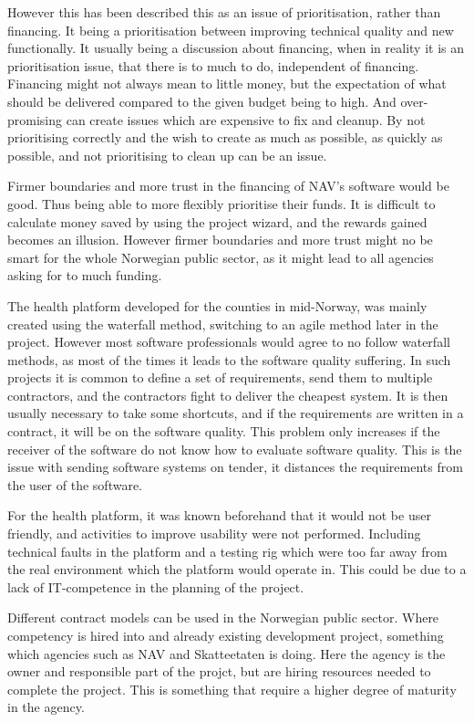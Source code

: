 However this has been described this as an issue of prioritisation, rather than financing. It being a prioritisation between improving technical quality and new functionally. It usually being a discussion about financing, when in reality it is an prioritisation issue, that there is to much to do, independent of financing. Financing might not always mean to little money, but the expectation of what should be delivered compared to the given budget being to high. And over-promising can create issues which are expensive to fix and cleanup. By not prioritising correctly and the wish to create as much as possible, as quickly as possible, and not prioritising to clean up can be an issue.

Firmer boundaries and more trust in the financing of NAV's software would be good. Thus being able to more flexibly prioritise their funds. It is difficult to calculate money saved by using the project wizard, and the rewards gained becomes an illusion. However firmer boundaries and more trust might no be smart for the whole Norwegian public sector, as it might lead to all agencies asking for to much funding.

The health platform developed for the counties in mid-Norway, was mainly created using the waterfall method, switching to an agile method later in the project. However most software professionals would agree to no follow waterfall methods, as most of the times it leads to the software quality suffering. In such projects it is common to define a set of requirements, send them to multiple contractors, and the contractors fight to deliver the cheapest system. It is then usually necessary to take some shortcuts, and if the requirements are written in a contract, it will be on the software quality. This problem only increases if the receiver of the software do not know how to evaluate software quality. This is the issue with sending software systems on tender, it distances the requirements from the user of the software.

For the health platform, it was known beforehand that it would not be user friendly, and activities to improve usability were not performed. Including technical faults in the platform and a testing rig which were too far away from the real environment which the platform would operate in. This could be due to a lack of IT-competence in the planning of the project.

Different contract models can be used in the Norwegian public sector. Where competency is hired into and already existing development project, something which agencies such as NAV and Skatteetaten is doing. Here the agency is the owner and responsible part of the projct, but are hiring resources needed to complete the project. This is something that require a higher degree of maturity in the agency.

